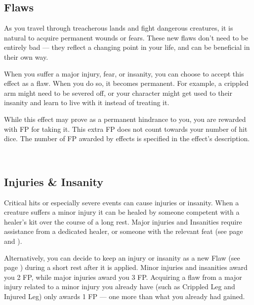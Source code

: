 \vspace{14.0cm}

\subsection*{Flaws} \label{ssec::flaws}
    As you travel through treacherous lands and fight dangerous creatures, it is natural to acquire permanent wounds or fears.
    These new flaws don't need to be entirely bad --- they reflect a changing point in your life, and can be beneficial in their own way.

    When you suffer a major injury, fear, or insanity, you can choose to accept this effect as a flaw.
    When you do so, it becomes permanent.
    For example, a crippled arm might need to be severed off, or your character might get used to their insanity and learn to live with it instead of treating it.

    While this effect may prove as a permanent hindrance to you, you are rewarded with FP for taking it.
    This extra FP does not count towards your number of hit dice.
    The number of FP awarded by effects is specified in the effect's description.


\pagebreak~
\vspace{11.5cm}

\subsection*{Injuries \& Insanity} \label{ssec::injuriesandinsanity}
    Critical hits or especially severe events can cause injuries or insanity.
    When a creature suffers a minor injury it can be healed by someone competent with a healer's kit over the course of a long rest.
    Major injuries and Insanities require assistance from a dedicated healer, or someone with the relevant feat (see page \pageref{feat::physician} and \pageref{feat::therapist}).

    Alternatively, you can decide to keep an injury or insanity as a new Flaw (see page \pageref{ssec::flaws}) during a short rest after it is applied.
    Minor injuries and insanities award you 2 FP, while major injuries award you 3 FP.
    Acquiring a flaw from a major injury related to a minor injury you already have (such as Crippled Leg and Injured Leg) only awards 1 FP --- one more than what you already had gained.

